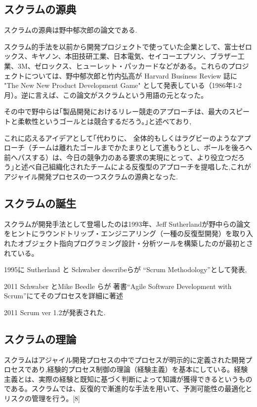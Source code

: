\documentclass[paper]{jrsj}
\begin{document}
\subsection{スクラムの源典}
スクラムの源典は野中郁次郎の論文\cite{takeuchi1986new}である.

スクラム的手法を以前から開発プロジェクトで使っていた企業として、富士ゼロックス、キヤノン、本田技研工業、日本電気、セイコーエプソン、ブラザー工業、3M、ゼロックス、ヒューレット・パッカードなどがある。これらのプロジェクトについては、野中郁次郎と竹内弘高が Harvard Business Review 誌に "The New New Product Development Game" として発表している（1986年1-2月）。逆に言えば、この論文がスクラムという用語の元となった。

その中で野中らは｢製品開発におけるリレー競走のアプローチは、最大のスピートと柔軟性というゴールとは競合するだろう。｣と述べており,

これに応えるアイデアとして｢代わりに、 全体的もしくはラグビーのようなアプローチ（チームは離れたゴールまでかたまりとして進もうとし、ボールを後ろへ前へパスする）は、今日の競争力のある要求の実現にとって、より役立つだろう｣と述べ自己組織化されたチームによる反復型のアプローチを提唱した,これがアジャイル開発プロセスの一つスクラムの源典となった.

\subsection{スクラムの誕生}


スクラムが開発手法として登場したのは1993年、Jeff Sutherlandが野中らの論文をヒントにラウンドトリップ・エンジニアリング（一種の反復型開発）を取り入れたオブジェクト指向プログラミング設計・分析ツールを構築したのが最初とされている。

1995に Sutherland と Schwaber describeらが “Scrum Methodology”として発表,

2011  Schwaber とMike Beedle らが 著書“Agile Software Development with Scrum”にてそのプロセスを詳細に著述

2011  Scrum ver 1.2が発表された.

\subsection{スクラムの理論}
スクラムはアジャイル開発プロセスの中でプロセスが明示的に定義された開発プロセスであり,経験的プロセス制御の理論（経験主義）を基本にしている。経験主義とは、実際の経験と既知に基づく判断によって知識が獲得できるというものである。スクラムでは、反復的で漸進的な手法を用いて、予測可能性の最適化とリスクの管理を行う。[8]
\end{document}
